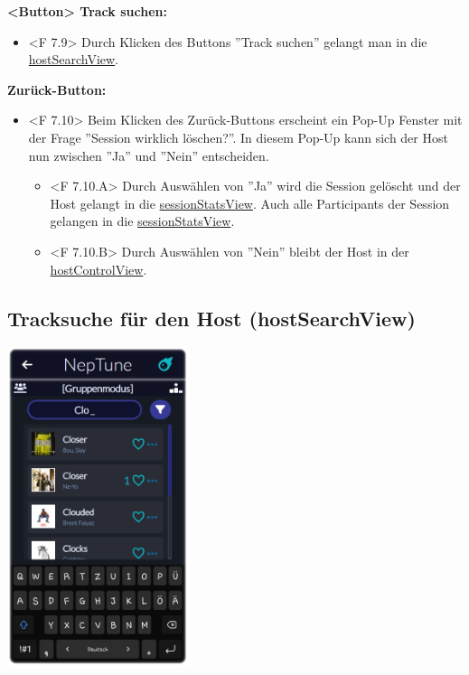 \documentclass[oneside, ngerman]{sdqtechreport}
\begin{document}
\textbf{<Button> Track suchen:}
\begin{itemize}
    \hypertarget{<F 7.9>}{}
    \item <F 7.9> Durch Klicken des Buttons ''Track suchen'' gelangt man in die \hyperlink{hostSearchView}{hostSearchView}.
\end{itemize}

\textbf{Zurück-Button:}
\begin{itemize}
    \hypertarget{<F 7.10>}{}
    \item <F 7.10> Beim Klicken des Zurück-Buttons erscheint ein Pop-Up Fenster mit der Frage ''Session wirklich löschen?''. In diesem Pop-Up kann sich der Host nun zwischen ''Ja'' und ''Nein'' entscheiden.
    \begin{itemize}
    \hypertarget{<F 7.10.A>}{}
        \item <F 7.10.A> Durch Auswählen von ''Ja'' wird die Session gelöscht und der Host gelangt in die \hyperlink{sessionStatsView}{sessionStatsView}. Auch alle Participants der Session gelangen in die \hyperlink{sessionStatsView}{sessionStatsView}.
        \hypertarget{<F 7.10.B>}{}
        \item <F 7.10.B> Durch Auswählen von ''Nein'' bleibt der Host in der \hyperlink{hostControlView}{hostControlView}.
    \end{itemize}
\end{itemize}

\subsection{Tracksuche für den Host (hostSearchView)}
\label{sec:Benutzeroberfläche:hostSearchView}


\begin{center}
    \hypertarget{hostSearchView}{}
    \includegraphics[width=0.4\textwidth]{LATEX/Pflichtenheft/GraphicDesigns/hostSearchPage.png}
\end{center}
\end{document}
